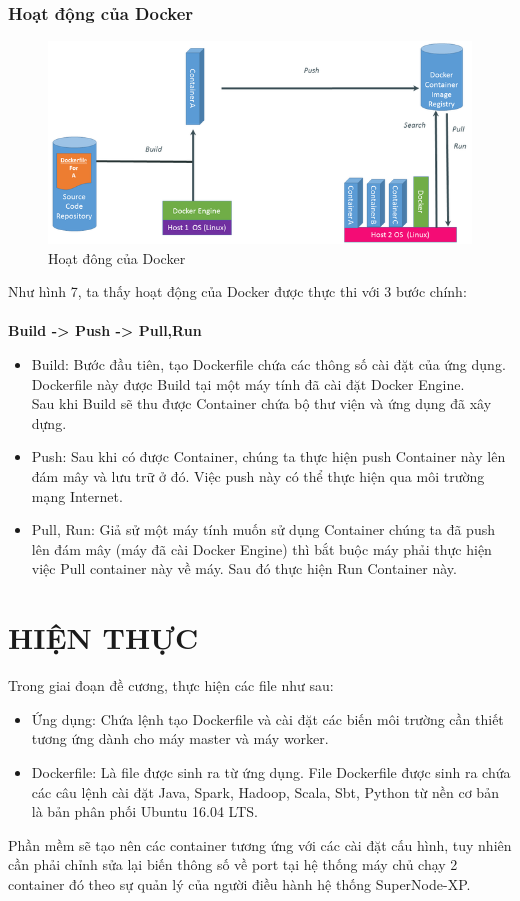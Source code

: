 \documentclass[11pt,a4paper]{article}
\begin{document}
\subsubsection{Hoạt động của Docker}
\begin{figure}
    \centering
    \includegraphics[width=16cm]{fig/basics-of-docker-system.png}
    \caption{Hoạt đông của Docker}
    \label{fig:process_docker}
\end{figure}
Như hình 7, ta thấy hoạt động của Docker được thực thi với 3 bước chính:\\
\\
\textbf{Build -> Push -> Pull,Run}\\
\begin{itemize}
    \item Build: Bước đầu tiên, tạo Dockerfile chứa các thông số cài đặt của ứng dụng. Dockerfile này được Build tại một máy tính đã cài đặt Docker Engine.\\
    Sau khi Build sẽ thu được Container chứa bộ thư viện và ứng dụng đã xây dựng.
    \item Push: Sau khi có được Container, chúng ta thực hiện push Container này lên đám mây và lưu trữ ở đó. Việc push này có thể thực hiện qua môi trường mạng Internet.
    \item Pull, Run: Giả sử một máy tính muốn sử dụng Container chúng ta đã push lên đám mây (máy đã cài Docker Engine) thì bắt buộc máy phải thực hiện việc Pull container này về máy. Sau đó thực hiện Run Container này.
\end{itemize}



\newpage
\section{HIỆN THỰC}
Trong giai đoạn đề cương, thực hiện các file như sau:
\begin{itemize}
    \item Ứng dụng: Chứa lệnh tạo Dockerfile và cài đặt các biến môi trường cần thiết tương ứng dành cho máy master và máy worker.
    \item Dockerfile: Là file được sinh ra từ ứng dụng. File Dockerfile được sinh ra chứa các câu lệnh cài đặt Java, Spark, Hadoop, Scala, Sbt, Python từ nền cơ bản là bản phân phối Ubuntu 16.04 LTS.
\end{itemize}
Phần mềm sẽ tạo nên các container tương ứng với các cài đặt cấu hình, tuy nhiên cần phải chỉnh sửa lại biến thông số về port tại hệ thống máy chủ chạy 2 container đó theo sự quản lý của người điều hành hệ thống SuperNode-XP.\\
\end{document}

